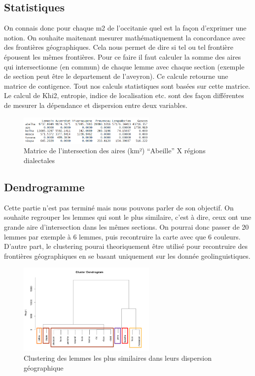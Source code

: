 \documentclass[a4paper, twoside]{article}
\begin{document}
\subsection{Statistiques}
On connais donc pour chaque m2 de l'occitanie quel est la façon d'exprimer 
une notion. On souhaite maitenant mesurer mathématiquement la concordance avec 
des frontières géographiques. Cela nous permet de dire si tel ou tel frontière 
épousent les mêmes frontières. Pour ce faire il faut calculer la somme des aires 
qui intersectionne (en commun) de chaque lemme avec chaque section 
(exemple de section peut être le departement de l'aveyron).
Ce calcule retourne une matrice de contigence.
Tout nos calculs statistiques sont basées sur cette matrice.
Le calcul de Khi2, entropie, indice de localisation etc. sont des façon 
différentes de mesurer la dépendance et dispersion entre deux variables.

\begin{figure}[h]
\caption{Matrice de l’intersection des aires (km²) “Abeille” X régions dialectales}
\centering
\includegraphics[width=0.6\textwidth]{matriceIntersection}
\end{figure}

\subsection{Dendrogramme}
Cette partie n'est pas terminé mais nous pouvons parler de son objectif.
On souhaite regrouper les lemmes qui sont le plus similaire, c'est à dire,
ceux ont une grande aire d'intersection dans les mêmes sections.
On pourrai donc passer de 20 lemmes par exemple à 6 lemmes, puis recontruire la 
carte avec que 6 couleurs. D'autre part, le clustering pourai theoriquement 
être utilisé pour recontruire des frontières géographiques en se basant 
uniquement sur les donnée geolinguistiques.

\begin{figure}[h]
\caption{Clustering des lemmes les plus similaires dans leurs dispersion géographique}
\centering
\includegraphics[width=0.6\textwidth]{dendrogramme}
\end{figure}
\end{document}
